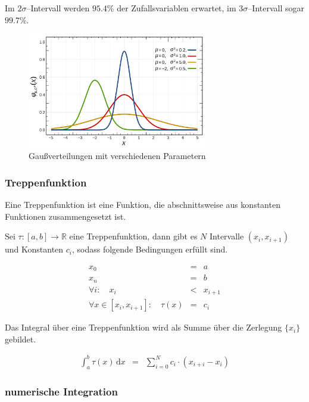 \documentclass[12pt,a4paper]{scrartcl}
\numberwithin{equation}{section} %
\begin{document}
Im $2\sigma$--Intervall werden $95.4\%$ der Zufallsvariablen erwartet, im $3\sigma$--Intervall sogar $99.7\%$.

\begin{figure}[h]
  \centering
  \includegraphics[width=0.7\textwidth]{../media/B1.1/Gaussverteilungen.pdf}
  \caption{Gaußverteilungen mit verschiedenen Parametern \cite{abb:gaussians}}
  \label{abb:gaussians}
\end{figure}

\hypertarget{treppenfunktion}{%
\subsubsection{Treppenfunktion}\label{treppenfunktion}}

Eine Treppenfunktion ist eine Funktion, die abschnittsweise aus konstanten Funktionen zusammengesetzt ist.

Sei $\tau:[a,b]\rightarrow \mathbb R$ eine Treppenfunktion, dann gibt es $N$ Intervalle $(x_i, x_{i+1})$ und Konstanten $c_i$, sodass folgende Bedingungen erfüllt sind. \cite{Einsiedler}

\begin{eqnarray}
  x_0 &=& a \\
  x_n &=& b \\
  \forall i:\quad
  x_i &<& x_{i+1} \\
  \forall x\in[x_i, x_{i+1}]:\quad
  \tau(x) &=& c_i
\end{eqnarray}

\noindent
Das Integral über eine Treppenfunktion wird als Summe über die Zerlegung $\{x_i\}$ gebildet.

\begin{eqnarray}
  \int_a^b\tau(x)\,\mathrm dx
  &=& \sum_{i=0}^N c_i\cdot (x_{i+i}-x_i)
\end{eqnarray}

\hypertarget{numerische-integration}{%
\subsubsection{numerische Integration}\label{numerische-integration}}
\end{document}
